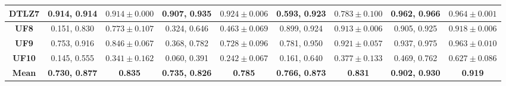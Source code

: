 \begin{table*}[t]
{\begin{tabular}{c|c|c|c|c|c|c|c|c|}
\multicolumn{1}{|c|}{\textbf{DTLZ7}} & 0.914, 0.914            & $0.914 \pm 0.000$       & 0.907, 0.935            & $0.924 \pm 0.006$       & 0.593, 0.923            & $0.783 \pm 0.100$       & 0.962, 0.966            & $0.964 \pm 0.001$       \\ \hline
\multicolumn{1}{|c|}{\textbf{UF8}}   & 0.151, 0.830            & $0.773 \pm 0.107$       & 0.324, 0.646            & $0.463 \pm 0.069$       & 0.899, 0.924            & $0.913 \pm 0.006$       & 0.905, 0.925            & $0.918 \pm 0.006$       \\ \hline
\multicolumn{1}{|c|}{\textbf{UF9}}   & 0.753, 0.916            & $0.846 \pm 0.067$       & 0.368, 0.782            & $0.728 \pm 0.096$       & 0.781, 0.950            & $0.921 \pm 0.057$       & 0.937, 0.975            & $0.963 \pm 0.010$       \\ \hline
\multicolumn{1}{|c|}{\textbf{UF10}}  & 0.145, 0.555            & $0.341 \pm 0.162$       & 0.060, 0.391            & $0.242 \pm 0.067$       & 0.161, 0.640            & $0.377 \pm 0.133$       & 0.469, 0.762            & $0.627 \pm 0.086$       \\ \hline
\multicolumn{1}{|c|}{\textbf{Mean}}  & \textbf{0.730, 0.877}   & \textbf{0.835}          & \textbf{0.735, 0.826}   & \textbf{0.785}          & \textbf{0.766, 0.873}   & \textbf{0.831}          & \textbf{0.902, 0.930}   & \textbf{0.919}          \\ \hline
\end{tabular}%
}
\end{table*}

